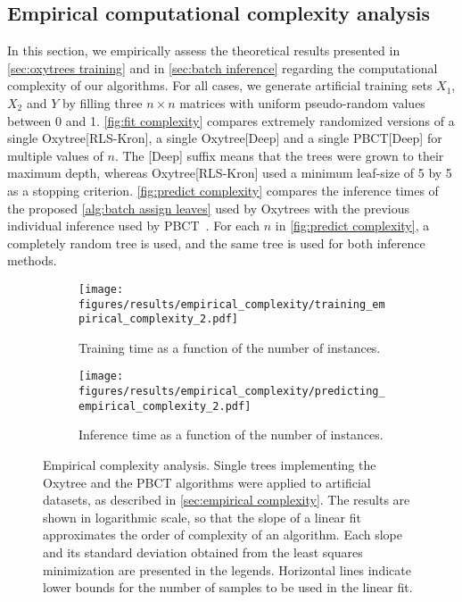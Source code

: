 \documentclass[sn-mathphys-num]{sn-jnl}%
\theoremstyle{thmstyleone}%
\theoremstyle{thmstyletwo}%
\theoremstyle{thmstylethree}%
\begin{document}
\subsection{Empirical computational complexity analysis}
\label{sec:empirical complexity}

In this section, we empirically assess the theoretical results presented in \autoref{sec:oxytrees training} and in \autoref{sec:batch inference} regarding the computational complexity of our algorithms. For all cases, we generate artificial training sets $X_1$, $X_2$ and $Y$ by filling three $n \times n$ matrices with uniform pseudo-random values between 0 and 1. \autoref{fig:fit complexity} compares extremely randomized versions of a single Oxytree[RLS-Kron], a single Oxytree[Deep] and a single PBCT[Deep] for multiple values of $n$. The [Deep] suffix means that the trees were grown to their maximum depth, whereas Oxytree[RLS-Kron] used a minimum leaf-size of 5 by 5 as a stopping criterion. \autoref{fig:predict complexity} compares the inference times of the proposed \autoref{alg:batch assign leaves} used by Oxytrees with the previous individual inference used by PBCT~\cite{pliakos_global_2018}. For each $n$ in \autoref{fig:predict complexity}, a completely random tree is used, and the same tree is used for both inference methods.
%
\begin{figure}
    \centering
    \begin{subfigure}{.47\textwidth}
        \texttt{[image: figures/results/empirical\_complexity/training\_empirical\_complexity\_2.pdf]}
        \caption{Training time as a function of the number of instances.}
        \label{fig:fit complexity}
    \end{subfigure}
    \hfill
    \begin{subfigure}{.47\textwidth}
        \texttt{[image: figures/results/empirical\_complexity/predicting\_empirical\_complexity\_2.pdf]}
        \caption{Inference time as a function of the number of instances.}
        \label{fig:predict complexity}
    \end{subfigure}
    \caption{Empirical complexity analysis. Single trees implementing the Oxytree and the PBCT algorithms were applied to artificial datasets, as described in \autoref{sec:empirical complexity}. The results are shown in logarithmic scale, so that the slope of a linear fit approximates the order of complexity of an algorithm. Each slope and its standard deviation obtained from the least squares minimization are presented in the legends. Horizontal lines indicate lower bounds for the number of samples to be used in the linear fit.}
    \label{fig:empirical complexity}
\end{figure}
\end{document}
